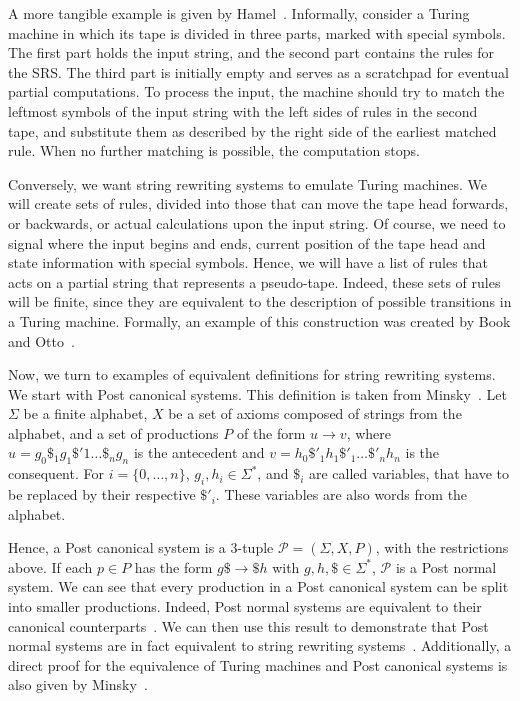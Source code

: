 \documentclass[12pt]{article}
\begin{document}
A more tangible example is given by Hamel~\cite{Hamel:misc:2016:sep}.
Informally, consider a Turing machine in which its tape is divided in three
parts, marked with special symbols. The first part holds the input string, and
the second part contains the rules for the SRS\@. The third part is initially
empty and serves as a scratchpad for eventual partial computations. To process
the input, the machine should try to match the leftmost symbols of the input
string with the left sides of rules in the second tape, and substitute them as
described by the right side of the earliest matched rule. When no further
matching is possible, the computation stops.

Conversely, we want string rewriting systems to emulate Turing machines. We
will create sets of rules, divided into those that can move the tape head
forwards, or backwards, or actual calculations upon the input string. Of
course, we need to signal where the input begins and ends, current position of
the tape head and state information with special symbols. Hence, we will have a
list of rules that acts on a partial string that represents a pseudo-tape.
Indeed, these sets of rules will be finite, since they are equivalent to the
description of possible transitions in a Turing machine. Formally, an example
of this construction was created by Book and Otto~\cite[Sec.
2.5]{Book:book:1993}.

Now, we turn to examples of equivalent definitions for string rewriting
systems. We start with Post canonical systems. This definition is taken from
Minsky~\cite[Sec. 12.5]{Minsky:book:1967}. Let $\Sigma$ be a finite alphabet,
$X$ be a set of axioms composed of strings from the alphabet, and a set of
productions $P$ of the form $u \rightarrow v$, where $u =
g_{0}\$_{1}g_{1}\$'{1} \dots \$_{n}g_{n}$ is the antecedent and $v =
h_{0}\$'_{1}h_{1}\$'_{1} \dots \$'_{n}h_{n}$ is the consequent. For $i = \{0,
\dots, n\}$, $g_{i}, h_{i} \in \Sigma^{*}$, and $\$_{i}$ are called variables,
that have to be replaced by their respective $\$'_{i}$. These variables are
also words from the alphabet.

Hence, a Post canonical system is a $3$-tuple $\mathcal{P} = (\Sigma, X, P)$,
with the restrictions above. If each $p \in P$ has the form $g\$ \rightarrow
\$h$ with $g, h, \$ \in \Sigma^{*}$, $\mathcal{P}$ is a Post normal system. We
can see that every production in a Post canonical system can be split into
smaller productions. Indeed, Post normal systems are equivalent to their
canonical counterparts~\cite[Theorem 13.1]{Minsky:book:1967}. We can then use
this result to demonstrate that Post normal systems are in fact equivalent to
string rewriting systems~\cite[Sec. 6.5, Theorem 5.1]{Davis:book:1958}.
Additionally, a direct proof for the equivalence of Turing machines and Post
canonical systems is also given by Minsky~\cite[Sec. 12.6]{Minsky:book:1967}.
\end{document}
